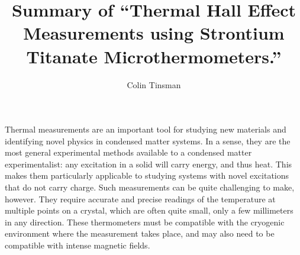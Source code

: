 \documentclass{article}
\title{Summary of ``Thermal Hall Effect Measurements using Strontium Titanate Microthermometers.''}
\author{Colin Tinsman}
\date{}
\begin{document}
\doublespacing
\maketitle
Thermal measurements are an important tool for studying new materials and identifying novel physics in condensed matter systems. In a sense, they are the most general experimental methods available to a condensed matter experimentalist: any excitation in a solid will carry energy, and thus heat. This makes them particularly applicable to studying systems with novel excitations that do not carry charge. Such measurements can be quite challenging to make, however. They require accurate and precise readings of the temperature at multiple points on a crystal, which are often quite small, only a few millimeters in any direction. These thermometers must be compatible with the cryogenic environment where the measurement takes place, and may also need to be compatible with intense magnetic fields.
\end{document}

